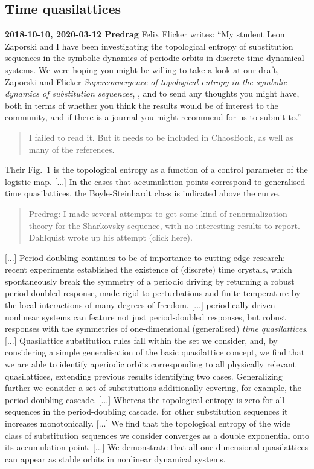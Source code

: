 \subsection{Time quasilattices}
\label{sect:timeQuasiLatt}

{\bf 2018-10-10, 2020-03-12 Predrag} Felix Flicker writes:
``My student Leon Zaporski and I have been investigating the
topological entropy of substitution sequences in the symbolic dynamics of
periodic orbits in discrete-time dynamical systems. We were hoping you
might be willing to take a look at our draft,
Zaporski and Flicker {\em Superconvergence of topological
entropy in the symbolic dynamics of substitution sequences},
,
and to send any
thoughts you might have, both in terms of whether you think the results
would be of interest to the community, and if there is a journal you
might recommend for us to submit to.''
\begin{quote}
                                        \toCB
I failed to read it. But it needs to be included in ChaosBook, as well
as many of the references.
\end{quote}
Their Fig.~1 is the topological entropy as a function of a control
parameter of the logistic map.
[...]
In the cases that accumulation points correspond to generalised time
quasilattices, the Boyle-Steinhardt class is indicated above
the curve.
\begin{quote}
Predrag:
I made several attempts to get some kind
of renormalization theory for the Sharkovsky sequence, with no
interesting results to report. Dahlquist wrote up his attempt
 {(click here)}.
\end{quote}
[...]
Period doubling continues to be of importance to cutting edge research:
recent experiments established the existence of (discrete) time crystals,
which spontaneously break the symmetry of a periodic driving by returning
a robust period-doubled response, made rigid to perturbations and finite
temperature by the local interactions of many degrees of freedom.
[...]
periodically-driven nonlinear systems can feature not just period-doubled
responses, but robust responses with the symmetries of one-dimensional
(generalised) \emph{time quasilattices}.
[...]
Quasilattice substitution rules fall within the set we consider, and, by
considering a simple generalisation of the basic quasilattice concept, we
find that we are able to identify aperiodic orbits corresponding to all
physically relevant quasilattices, extending previous results identifying
two cases. Generalizing further we consider a set of substitutions
additionally covering, for example, the period-doubling cascade.
[...]
Whereas the topological entropy is zero for all sequences in the
period-doubling cascade, for other substitution sequences it increases
monotonically.
[...]
We find that the topological entropy of the wide class of substitution
sequences we consider converges as a double exponential onto its
accumulation point.
[...]
We demonstrate that all one-dimensional quasilattices can appear as
stable orbits in nonlinear dynamical systems.

